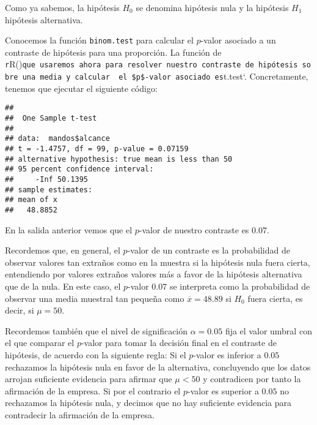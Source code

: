 \documentclass[
  degree=mecinf,
  title=normal,
  toc=normal,
  bib=normal]{mnye}
\newenvironment{Shaded}{\begin{snugshade}}{\end{snugshade}}
\newcommand{\AttributeTok}[1]{\textcolor[rgb]{0.77,0.63,0.00}{#1}}
\newcommand{\DecValTok}[1]{\textcolor[rgb]{0.00,0.00,0.81}{#1}}
\newcommand{\FunctionTok}[1]{\textcolor[rgb]{0.00,0.00,0.00}{#1}}
\newcommand{\NormalTok}[1]{#1}
\newcommand{\SpecialCharTok}[1]{\textcolor[rgb]{0.00,0.00,0.00}{#1}}
\newcommand{\StringTok}[1]{\textcolor[rgb]{0.31,0.60,0.02}{#1}}
\begin{document}
Como ya sabemos, la hipótesis \(H_0\) se denomina hipótesis nula y la hipótesis \(H_1\) hipótesis alternativa.

Conocemos la función \texttt{binom.test} para calcular el \(p\)-valor asociado a un contraste de hipótesis para una proporción.
La función de \texttt{r}R()\texttt{que\ usaremos\ ahora\ para\ resolver\ nuestro\ contraste\ de\ hipótesis\ sobre\ una\ media\ y\ calcular\ \ el\ \$p\$-valor\ asociado\ es}t.test`. Concretamente, tenemos que ejecutar el siguiente código:

\begin{Shaded}
\end{Shaded}

\begin{verbatim}
## 
##  One Sample t-test
## 
## data:  mandos$alcance
## t = -1.4757, df = 99, p-value = 0.07159
## alternative hypothesis: true mean is less than 50
## 95 percent confidence interval:
##     -Inf 50.1395
## sample estimates:
## mean of x 
##   48.8852
\end{verbatim}

En la salida anterior vemos que el \(p\)-valor de nuestro contraste es \(0.07\).

Recordemos que, en general, el \(p\)-valor de un contraste es la probabilidad de observar valores tan extraños como en la muestra si la hipótesis nula fuera cierta, entendiendo por valores extraños valores más a favor de la hipótesis alternativa que de la nula.
En este caso, el \(p\)-valor \(0.07\) se interpreta como la probabilidad de observar una media muestral tan pequeña como \(\overline{x}=48.89\) si \(H_0\) fuera cierta, es decir, si \(\mu=50\).

Recordemos también que el nivel de significación \(\alpha = 0.05\) fija el valor umbral con el que comparar el \(p\)-valor para tomar la decisión final en el contraste de hipótesis, de acuerdo con la siguiente regla:
Si el \(p\)-valor es inferior a \(0.05\) rechazamos la hipótesis nula en favor de la alternativa, concluyendo que los datos arrojan suficiente evidencia para afirmar que \(\mu<50\) y contradicen por tanto la afirmación de la empresa.
Si por el contrario el \(p\)-valor es superior a \(0.05\) no rechazamos la hipótesis nula, y decimos que no hay suficiente evidencia para contradecir la afirmación de la empresa.
\end{document}
